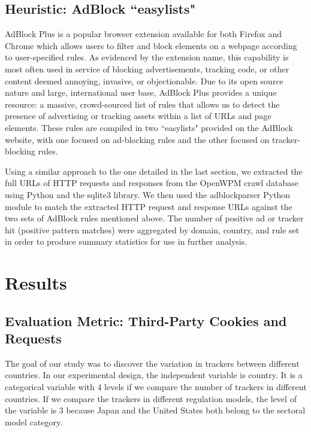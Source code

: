 \documentclass[conference]{IEEEtran}
\begin{document}
\subsection{Heuristic: AdBlock ``easylists"}

AdBlock Plus \cite{adblock}  is a popular browser extension available for both Firefox and Chrome which allows users to filter and block elements on a webpage according to user-specified rules. As evidenced by the extension name, this capability is most often used in service of blocking advertisements, tracking code, or other content deemed annoying, invasive, or objectionable. Due to its open source nature and large, international user base, AdBlock Plus provides a unique resource: a massive, crowd-sourced list of rules that allows us to detect the presence of advertising or tracking assets within a list of URLs and page elements. These rules are compiled in two ``easylists"  \cite{easylist} provided on the AdBlock website, with one focused on ad-blocking rules and the other focused on tracker-blocking rules.

Using a similar approach to the one detailed in the last section, we extracted the full URLs of HTTP requests and responses from the OpenWPM crawl database using Python and the sqlite3 library. We then used the adblockparser  \cite{adblockparser} Python module to match the extracted HTTP request and response URLs against the two sets of AdBlock rules mentioned above. The number of positive ad or tracker hit (positive pattern matches) were aggregated by domain, country, and rule set in order to produce summary statistics for use in further analysis.





\section{Results}
\subsection{Evaluation Metric: Third-Party Cookies and Requests}

The goal of our study was to discover the variation in trackers between different countries.  In our experimental design, the independent variable is country. It is a categorical variable with 4 levels if we compare the number of trackers in different countries. If we compare the trackers in different regulation models, the level of the variable is 3 because Japan and the United States both belong to the sectoral model category. 
\end{document}

